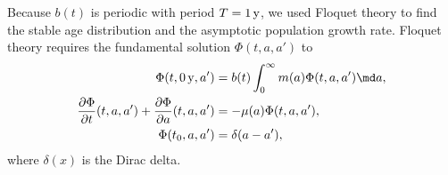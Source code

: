 \documentclass{jpmarticle}
\begin{document}
Because $b(t)$ is periodic with period $T = \unit[1]{y}$, we used
Floquet theory \autocite{parker_1992} to find the stable age
distribution and the asymptotic population growth rate. Floquet theory
requires the fundamental solution $\Phi(t, a, a')$ to
\begin{equation}
  \begin{split}
    \Phi(t, \unit[0]{y}, a')
    &= b(t) \int_0^\infty m(a) \Phi(t, a, a') \md a,
    \\
    \frac{\partial \Phi}{\partial t}(t, a, a')
    + \frac{\partial \Phi}{\partial a}(t, a, a')
    &= - \mu(a) \Phi(t, a, a'),
    \\
    \Phi(t_0, a, a')
    &= \delta(a - a'),
  \end{split}
\end{equation}
where $\delta(x)$ is the Dirac delta.
\end{document}
